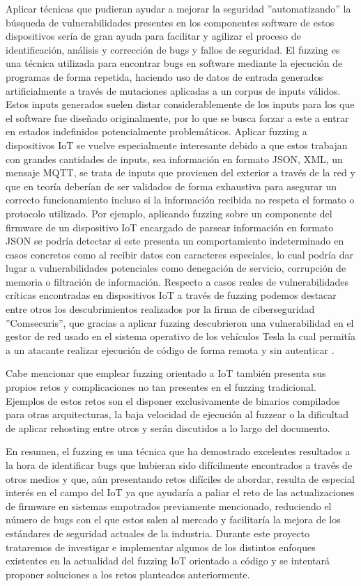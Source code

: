 Aplicar técnicas que pudieran ayudar a mejorar la seguridad ''automatizando'' la búsqueda de vulnerabilidades presentes en los componentes software 
de estos dispositivos sería de gran ayuda para facilitar y agilizar el proceso de identificación, análisis y corrección 
de bugs y fallos de seguridad. El fuzzing es una técnica utilizada para encontrar bugs en software mediante la ejecución de 
programas de forma repetida, haciendo uso de datos de entrada generados artificialmente a través de mutaciones aplicadas a un
corpus de inputs válidos. Estos inputs generados suelen distar considerablemente de los inputs para los que el software fue diseñado 
originalmente, por lo que se busca forzar a este a entrar en estados indefinidos potencialmente problemáticos. Aplicar
fuzzing a dispositivos IoT se vuelve especialmente interesante debido a que estos trabajan con grandes cantidades de inputs,
sea información en formato JSON, XML, un mensaje MQTT, se trata de inputs que provienen del exterior a través de la red y que en teoría deberían de ser validados 
de forma exhaustiva para asegurar un correcto funcionamiento incluso si la información recibida no respeta el formato o protocolo 
utilizado. Por ejemplo, aplicando fuzzing sobre un componente del firmware de un dispositivo IoT encargado de parsear información en formato JSON
se podría detectar si este presenta un comportamiento indeterminado en casos concretos como al recibir datos con caracteres especiales, lo cual
podría dar lugar a vulnerabilidades potenciales como denegación de servicio, corrupción de memoria o filtración de información. Respecto a casos reales
de vulnerabilidades críticas encontradas en dispositivos IoT a través de fuzzing podemos destacar entre otros los descubrimientos realizados por la firma 
de ciberseguridad ''Comsecuris'', que gracias a aplicar fuzzing descubrieron una vulnerabilidad en el gestor de red usado en el 
sistema operativo de los vehículos Tesla la cual permitía a un atacante realizar ejecución de código de forma remota y sin autenticar \cite{TeslaMCU}.\bigskip

Cabe mencionar que emplear fuzzing orientado a IoT también presenta sus propios retos y complicaciones no tan presentes en el fuzzing tradicional. 
Ejemplos de estos retos son el disponer exclusivamente de binarios compilados para otras arquitecturas, la baja velocidad de ejecución al fuzzear o la 
dificultad de aplicar rehosting entre otros y serán discutidos a lo largo del documento.\bigskip

En resumen, el fuzzing es una técnica que ha demostrado excelentes resultados a la hora de identificar bugs 
que hubieran sido difícilmente encontrados a través de otros medios y que, aún presentando retos difíciles de abordar, resulta de especial interés en
el campo del IoT ya que ayudaría a paliar el reto de las actualizaciones de firmware en sistemas empotrados previamente mencionado, reduciendo el número de bugs con el que 
estos salen al mercado y facilitaría la mejora de los estándares de seguridad actuales de la industria. Durante este proyecto trataremos de investigar
e implementar algunos de los distintos enfoques existentes en la actualidad del fuzzing IoT orientado a código y se intentará proponer 
soluciones a los retos planteados anteriormente.

